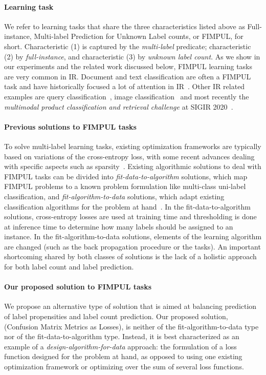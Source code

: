 \paragraph{Learning task}
We refer to learning tasks that share the three characteristics listed above as Full-instance, Multi-label Prediction for Unknown Label counts, or FIMPUL, for short.
Characteristic (1) is captured by the \emph{multi-label} predicate; characteristic (2) by \emph{full-instance}, and characteristic (3) by \emph{unknown label count}.
As we show in our experiments and the related work discussed below, FIMPUL learning tasks are very common in \ac{IR}. Document and text classification are often a FIMPUL task and have historically focused a lot of attention in \ac{IR}~\cite{IRClassStat, textCategorization, statTextCategorization, documentClassification}. Other \ac{IR} related examples are query classification~\cite{queryClassification}, image classification~\cite{imageClassification} and most recently the \textit{multimodal product classification and retrieval challenge} at SIGIR 2020~\cite{Amoualian2020SIGIR2E}.

\paragraph{Previous solutions to FIMPUL tasks}
To solve multi-label learning tasks, existing optimization frameworks are typically based on variations of the cross-entropy loss, with some recent advances dealing with specific aspects such as sparsity~\citep[see, e.g.,][]{focalLoss,tencent}.
Existing algorithmic solutions to deal with FIMPUL tasks can be divided into \emph{fit-data-to-algorithm} solutions, which map FIMPUL problems to a known problem formulation like multi-class uni-label classification, and \emph{fit-algorithm-to-data} solutions, which adapt existing classification algorithms for the problem at hand~\citep{multilabelMethods}. In the fit-data-to-algorithm solutions, cross-entropy losses are used at training time and thresholding is done at inference time to determine how many labels should be assigned to an instance. In the fit-algorithm-to-data solutions, elements of the learning algorithm are changed (such as the back propagation procedure or the tasks). An important shortcoming shared by both classes of solutions is the lack of a holistic approach for both label count and label prediction.

\paragraph{Our proposed solution to FIMPUL tasks}
We propose an alternative type of solution that is aimed at balancing prediction of label propensities and label count prediction. Our proposed solution, \solution (Confusion Matrix Metrics as Losses), is neither of the fit-algorithm-to-data type nor of the fit-data-to-algorithm type.
Instead, it is best characterized as an example of a \emph{design-algorithm-for-data} approach: the formulation of a loss function designed for the problem at hand, as opposed to using one existing optimization framework or optimizing over the sum of several loss functions.

